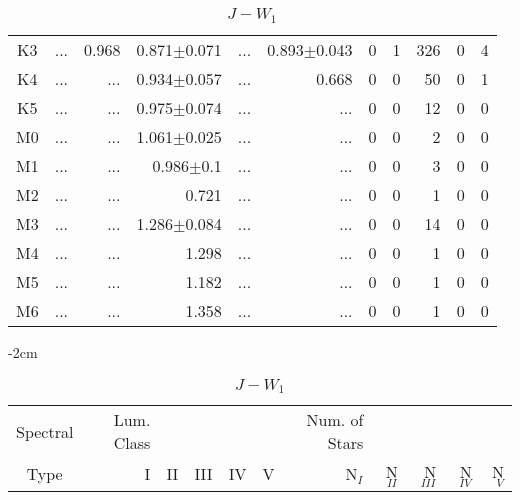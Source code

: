 \begin{table}[t]
\begin{table}[t]
\begin{center}
\begin{tabular}{c|rrrrr|rrrrr}
    K3	&	 ...	&	0.968	&	0.871$\pm$0.071	&	 ...	&	0.893$\pm$0.043	&	0	&	1	&	326	&	0	&	4	\\
    K4	&	 ...	&	 ...	&	0.934$\pm$0.057	&	 ...	&	0.668	&	0	&	0	&	50	&	0	&	1	\\
    K5	&	 ...	&	 ...	&	0.975$\pm$0.074	&	 ...	&	 ...	&	0	&	0	&	12	&	0	&	0	\\
    M0	&	 ...	&	 ...	&	1.061$\pm$0.025	&	 ...	&	 ...	&	0	&	0	&	2	&	0	&	0	\\
    M1	&	 ...	&	 ...	&	0.986$\pm$0.1	&	 ...	&	 ...	&	0	&	0	&	3	&	0	&	0	\\
    M2	&	 ...	&	 ...	&	0.721	&	 ...	&	 ...	&	0	&	0	&	1	&	0	&	0	\\
    M3	&	 ...	&	 ...	&	1.286$\pm$0.084	&	 ...	&	 ...	&	0	&	0	&	14	&	0	&	0	\\
    M4	&	 ...	&	 ...	&	1.298	&	 ...	&	 ...	&	0	&	0	&	1	&	0	&	0	\\
    M5	&	 ...	&	 ...	&	1.182	&	 ...	&	 ...	&	0	&	0	&	1	&	0	&	0	\\
    M6	&	 ...	&	 ...	&	1.358	&	 ...	&	 ...	&	0	&	0	&	1	&	0	&	0	\\
        \bottomrule
        \end{tabular}
    \end{center}
    \end{table}
    
    
    \begin{table}[t]
    \tiny
    \centering
    \caption{$J-W_{1}$}
    \begin{center}
        \addtolength{\leftskip} {-2cm}
        \addtolength{\rightskip}{-2cm}
        \begin{tabular}{c|rrrrr|rrrrr}
        \toprule
        Spectral & Lum. Class & & & & & Num. of Stars & & & &  \\
        Type & I & II & III &  IV & V & N$_{I}$ & N$_{II}$ & N$_{III}$ & N$_{IV}$ & N$_{V}$ \\ \midrule
      

\end{tabular}
\end{center}
\end{table}
\end{table}
